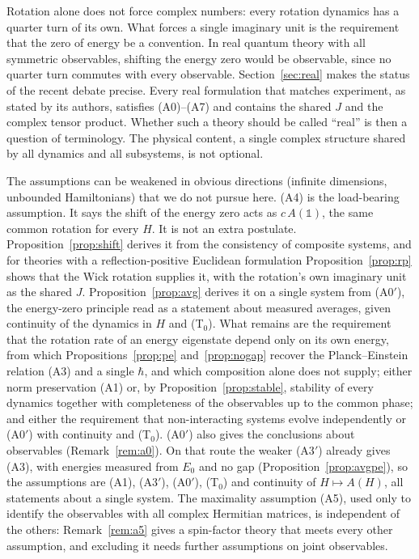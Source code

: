 \documentclass[11pt]{article}
\theoremstyle{remark}
\newcommand{\one}{\mathbb{1}}
\begin{document}
Rotation alone does not force complex numbers: every rotation dynamics has a quarter turn of its own. What forces a single imaginary unit is the requirement that the zero of energy be a convention. In real quantum theory with all symmetric observables, shifting the energy zero would be observable, since no quarter turn commutes with every observable. Section~\ref{sec:real} makes the status of the recent debate \cite{HoffreumonWoods,BarriosHita,MaioliCuradoGazeau,BangChoBaek,FengRenVedral} precise. Every real formulation that matches experiment, as stated by its authors, satisfies (A0)--(A7) and contains the shared $J$ and the complex tensor product. Whether such a theory should be called ``real'' is then a question of terminology. The physical content, a single complex structure shared by all dynamics and all subsystems, is not optional.

The assumptions can be weakened in obvious directions (infinite dimensions, unbounded Hamiltonians) that we do not pursue here. (A4) is the load-bearing assumption. It says the shift of the energy zero acts as $c\,A(\one)$, the same common rotation for every $H$. It is not an extra postulate. Proposition~\ref{prop:shift} derives it from the consistency of composite systems, and for theories with a reflection-positive Euclidean formulation Proposition~\ref{prop:rp} shows that the Wick rotation supplies it, with the rotation's own imaginary unit as the shared $J$. Proposition~\ref{prop:avg} derives it on a single system from (A0$'$), the energy-zero principle read as a statement about measured averages, given continuity of the dynamics in $H$ and (T$_0$). What remains are the requirement that the rotation rate of an energy eigenstate depend only on its own energy, from which Propositions~\ref{prop:pe} and~\ref{prop:nogap} recover the Planck--Einstein relation (A3) and a single $\hbar$, and which composition alone does not supply; either norm preservation (A1) or, by Proposition~\ref{prop:stable}, stability of every dynamics together with completeness of the observables up to the common phase; and either the requirement that non-interacting systems evolve independently or (A0$'$) with continuity and (T$_0$). (A0$'$) also gives the conclusions about observables (Remark~\ref{rem:a0}). On that route the weaker (A3$'$) already gives (A3), with energies measured from $E_0$ and no gap (Proposition~\ref{prop:avgpe}), so the assumptions are (A1), (A3$'$), (A0$'$), (T$_0$) and continuity of $H\mapsto A(H)$, all statements about a single system. The maximality assumption (A5), used only to identify the observables with all complex Hermitian matrices, is independent of the others: Remark~\ref{rem:a5} gives a spin-factor theory that meets every other assumption, and excluding it needs further assumptions on joint observables.
\end{document}
